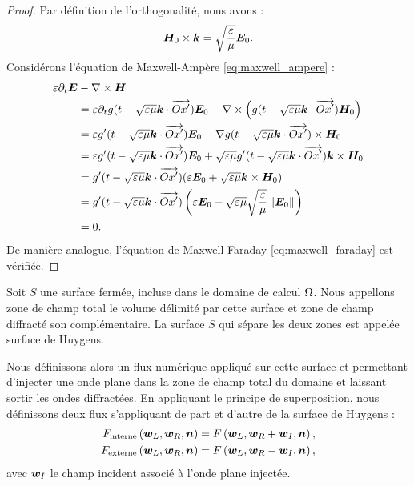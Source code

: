 \begin{proof}
	Par définition de l'orthogonalité, nous avons :
	\begin{align}
	\bm{H}_0 \times \bm{k} = \sqrt{\frac{\varepsilon}{\mu}} \bm{E}_0 .
	\end{align}
	Considérons l'équation de Maxwell-Ampère \eqref{eq:maxwell_ampere} :
	\begin{equation}
	\begin{aligned}
	\varepsilon \partial_{t} \bm{E} &- \nabla\times \bm{H} \\
	&= \varepsilon \partial_{t}
	g(t - \sqrt{\varepsilon\mu} \bm{k} \cdot \overrightarrow{Ox'}) \bm{E}_0 -
	\nabla\times \left(g(t - \sqrt{\varepsilon\mu} \bm{k} \cdot \overrightarrow{Ox'}) \bm{H}_0\right) \\
	&= \varepsilon g'(t - \sqrt{\varepsilon\mu} \bm{k} \cdot \overrightarrow{Ox'}) \bm{E}_0 -
	\nabla g(t - \sqrt{\varepsilon\mu} \bm{k} \cdot \overrightarrow{Ox'}) \times \bm{H}_0 \\
	&= \varepsilon g'(t - \sqrt{\varepsilon\mu} \bm{k} \cdot \overrightarrow{Ox'}) \bm{E}_0 +
	\sqrt{\varepsilon\mu} g'(t - \sqrt{\varepsilon\mu} \bm{k} \cdot \overrightarrow{Ox'}) \bm{k} \times \bm{H}_0 \\
	&= g'(t - \sqrt{\varepsilon\mu} \bm{k} \cdot \overrightarrow{Ox'}) (\varepsilon  \bm{E}_0 +
	\sqrt{\varepsilon\mu} \bm{k} \times \bm{H}_0) \\
	&= g'(t - \sqrt{\varepsilon\mu} \bm{k} \cdot \overrightarrow{Ox'}) \left(\varepsilon  \bm{E}_0 -
	\sqrt{\varepsilon\mu} \sqrt{\frac{\varepsilon}{\mu}} \left\Vert\bm{E}_0\right\Vert\right) \\
	&= 0 .
	\end{aligned}
	\end{equation}
	De manière analogue, l'équation de Maxwell-Faraday
	\eqref{eq:maxwell_faraday} est vérifiée.
\end{proof}

Soit $S$ une surface fermée, incluse dans le domaine de calcul $\Omega$.
Nous appellons zone de champ total le volume délimité par cette surface
et zone de champ diffracté son complémentaire.
La surface $S$ qui sépare les deux zones est appelée surface de Huygens.

Nous définissons alors un flux numérique appliqué sur cette surface
et permettant d’injecter une onde plane dans la zone de champ total
du domaine et laissant sortir les ondes diffractées. En appliquant le principe de superposition, nous définissons deux flux s’appliquant
de part et d’autre de la surface de Huygens :
\begin{subequations}
	\begin{align}
		F_\mathrm{interne}\left(\bm{w}_L,\bm{w}_R,\bm{n}\right) = 
		F\left(\bm{w}_L,\bm{w}_R + \bm{w}_I,\bm{n}\right) ,
		\\
		F_\mathrm{externe}\left(\bm{w}_L,\bm{w}_R,\bm{n}\right) = 
		F\left(\bm{w}_L,\bm{w}_R - \bm{w}_I,\bm{n}\right) ,
	\end{align}
\end{subequations}
avec $\bm{w}_I$ le champ incident associé à
l'onde plane injectée.
\\

